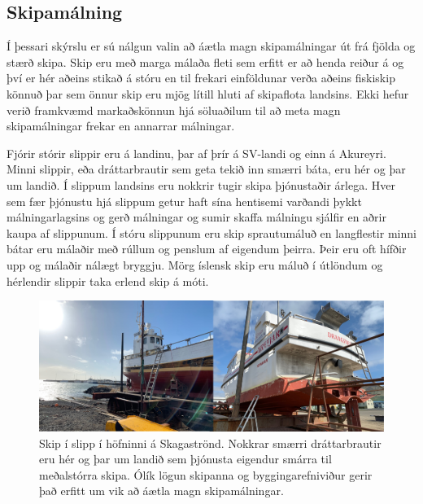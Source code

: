 \documentclass[icelandic,]{book}
\begin{document}
\hypertarget{skipamalning}{%
\subsection*{Skipamálning}\label{skipamalning}}

Í þessari skýrslu er sú nálgun valin að áætla magn skipamálningar út frá fjölda og stærð skipa. Skip eru með marga málaða fleti sem erfitt er að henda reiður á og því er hér aðeins stikað á stóru en til frekari einföldunar verða aðeins fiskiskip könnuð þar sem önnur skip eru mjög lítill hluti af skipaflota landsins. Ekki hefur verið framkvæmd markaðskönnun hjá söluaðilum til að meta magn skipamálningar frekar en annarrar málningar.

Fjórir stórir slippir eru á landinu, þar af þrír á SV-landi og einn á Akureyri. Minni slippir, eða dráttarbrautir sem geta tekið inn smærri báta, eru hér og þar um landið. Í slippum landsins eru nokkrir tugir skipa þjónustaðir árlega. Hver sem fær þjónustu hjá slippum getur haft sína hentisemi varðandi þykkt málningarlagsins og gerð málningar og sumir skaffa málningu sjálfir en aðrir kaupa af slippunum. Í stóru slippunum eru skip sprautumáluð en langflestir minni bátar eru málaðir með rúllum og penslum af eigendum þeirra. Þeir eru oft hífðir upp og málaðir nálægt bryggju. Mörg íslensk skip eru máluð í útlöndum og hérlendir slippir taka erlend skip á móti.

\begin{figure}

{\centering \includegraphics[width=1\linewidth]{myndir/slippurb} 

}

\caption{Skip í slipp í höfninni á Skagaströnd. Nokkrar smærri dráttarbrautir eru hér og þar um landið sem þjónusta eigendur smárra til meðalstórra skipa. Ólík lögun skipanna og byggingarefniviður gerir það erfitt um vik að áætla magn skipamálningar.}\label{fig:Slippur}
\end{figure}
\end{document}
